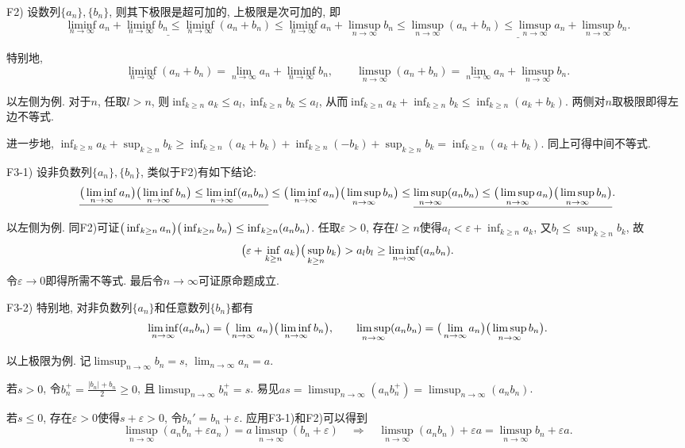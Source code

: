 F2) 设数列$\{ a_n \}, \{ b_n \}$, 则其下极限是超可加的, 上极限是次可加的, 即
$$\underline{\liminf_{n\to \infty} a_n + \liminf_{n\to \infty} b_n \leq \liminf_{n\to \infty} (a_n+b_n) }\leq \liminf_{n\to \infty} a_n + \limsup_{n\to \infty} b_n \leq \underline{\limsup_{n\to \infty} (a_n+b_n) \leq \limsup_{n\to \infty} a_n + \limsup_{n\to \infty} b_n}.$$

特别地, $$\liminf_{n\to \infty} (a_n+b_n)  = \lim_{n\to \infty} a_n + \liminf_{n\to \infty} b_n , \qquad \limsup_{n\to \infty} (a_n+b_n)  = \lim_{n\to \infty} a_n + \limsup_{n\to \infty} b_n. $$

\begin{solution}
	以左侧为例. 对于$n$, 任取$l >n$, 则$\inf_{k \geq n}a_k \leq a_l, \inf_{k \geq n}b_k \leq a_l$, 从而$\inf_{k \geq n}a_k + \inf_{k \geq n}b_k \leq \inf_{k \geq n}(a_k+b_k)$. 两侧对$n$取极限即得左边不等式. 
	
	进一步地, $\inf_{k \geq n}a_k + \sup_{k \geq n}b_k \geq \inf_{k \geq n}(a_k+b_k) + \inf_{k \geq n}(-b_k) + \sup_{k \geq n}b_k = \inf_{k \geq n}(a_k+b_k)$. 同上可得中间不等式. 
\end{solution}

F3-1) 设非负数列$\{ a_n \}, \{ b_n \}$, 类似于F2)有如下结论: 
$$\underline{\big( \liminf_{n\to \infty} a_n \big)\big(  \liminf_{n\to \infty} b_n \big) \leq \liminf_{n\to \infty} (a_nb_n) }\leq \big( \liminf_{n\to \infty} a_n \big)\big(  \limsup_{n\to \infty} b_n \big) \leq \underline{\limsup_{n\to \infty} (a_nb_n) \leq \big( \limsup_{n\to \infty} a_n \big)\big(  \limsup_{n\to \infty} b_n \big)}.$$

\begin{solution}
	以左侧为例. 同F2)可证$\big( \inf_{k\geq n}a_n \big) \big( \inf_{k\geq n}b_n \big) \leq \inf_{k\geq n}(a_nb_n)$. 任取$\varepsilon >0$, 存在$l \geq n$使得$a_l < \varepsilon + \inf_{k\geq n} a_k$, 又$b_l \leq \sup_{k\geq n}b_k$, 故$$\big( \varepsilon + \inf_{k\geq n} a_k \big) \big( \sup_{k\geq n}b_k \big) >a_lb_l \geq \liminf_{n\to \infty} (a_nb_n). $$
	令$\varepsilon \to 0$即得所需不等式. 最后令$n\to \infty$可证原命题成立. 
\end{solution}

F3-2) 特别地, 对非负数列$\{ a_n \}$和任意数列$\{ b_n \}$都有$$\liminf_{n\to \infty} (a_nb_n) = \big( \lim_{n\to \infty} a_n \big) \big( \liminf_{n\to \infty} b_n \big), \qquad \limsup_{n\to \infty} (a_nb_n) = \big( \lim_{n\to \infty} a_n \big) \big( \limsup_{n\to \infty} b_n \big).$$

\begin{solution}
	以上极限为例. 记$\limsup_{n\to \infty} b_n=s$, $\lim_{n\to \infty} a_n =a$. 
	
	若$s>0$, 令$b_n^+=\frac{|b_n|+b_n}{2} \geq 0$, 且$\limsup_{n\to \infty} b_n^+ = s$. 易见$as = \limsup_{n\to \infty}(a_nb_n^+) = \limsup_{n\to \infty}(a_nb_n)$. 
	
	若$s \leq 0$, 存在$\varepsilon >0$使得$s + \varepsilon >0$, 令$b_n' = b_n+\varepsilon$. 应用F3-1)和F2)可以得到$$\limsup_{n\to \infty}(a_nb_n+\varepsilon a_n) = a\limsup_{n\to \infty} (b_n+\varepsilon) \quad \Rightarrow \quad  \limsup_{n\to \infty} (a_nb_n) + \varepsilon a = \limsup_{n\to \infty} b_n + \varepsilon a. $$
\end{solution}


